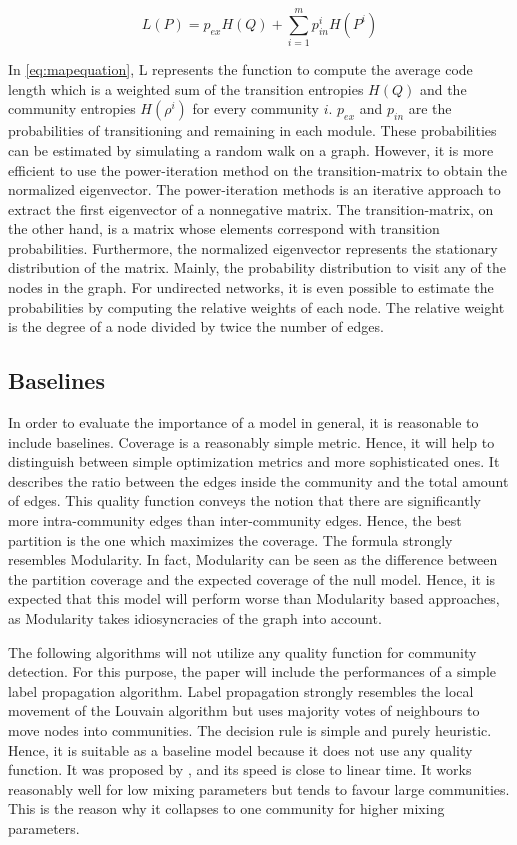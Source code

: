 \documentclass[11pt, twocolumn]{article}
\begin{document}
\begin{equation}
    \label{eq:mapequation}
    L(P) = p_{ex} H(Q) + \sum_{i=1}^m p_{in}^iH(P^i)
\end{equation}

In \autoref{eq:mapequation}, L represents the function to compute the average code length which is a weighted sum of the transition entropies $H(Q)$ and the community entropies $H(\rho^i)$ for every community $i$. $p_{ex}$ and $p_{in}$ are the probabilities of transitioning and remaining in each module. These probabilities can be estimated by simulating a random walk on a graph. However, it is more efficient to use the power-iteration method on the transition-matrix to obtain the normalized eigenvector. The power-iteration methods is an iterative approach to extract the first eigenvector of a nonnegative matrix. The transition-matrix, on the other hand, is a matrix whose elements correspond with transition probabilities.
Furthermore, the normalized eigenvector represents the stationary distribution of the matrix. Mainly, the probability distribution to visit any of the nodes in the graph. For undirected networks, it is even possible to estimate the probabilities by computing the relative weights of each node. The relative weight is the degree of a node divided by twice the number of edges.            

\subsection{Baselines}
In order to evaluate the importance of a model in general, it is reasonable to include baselines. Coverage is a reasonably simple metric. Hence, it will help to distinguish between simple optimization metrics and more sophisticated ones. It describes the ratio between the edges inside the community and the total amount of edges.\cite{fortunato_CommunityDetectionGraphs_2010} This quality function conveys the notion that there are significantly more intra-community edges than inter-community edges. Hence, the best partition is the one which maximizes the coverage. The formula strongly resembles Modularity. In fact, Modularity can be seen as the difference between the partition coverage and the expected coverage of the null model. Hence, it is expected that this model will perform worse than Modularity based approaches, as Modularity takes idiosyncracies of the graph into account.

The following algorithms will not utilize any quality function for community detection. For this purpose, the paper will include the performances of a simple label propagation algorithm. Label propagation strongly resembles the local movement of the Louvain algorithm but uses majority votes of neighbours to move nodes into communities. The decision rule is simple and purely heuristic. Hence, it is suitable as a baseline model because it does not use any quality function. It was proposed by \cite{raghavan_LinearTimeAlgorithm_2007}, and its speed is close to linear time. It works reasonably well for low mixing parameters but tends to favour large communities. This is the reason why it collapses to one community for higher mixing parameters. 
\end{document}
